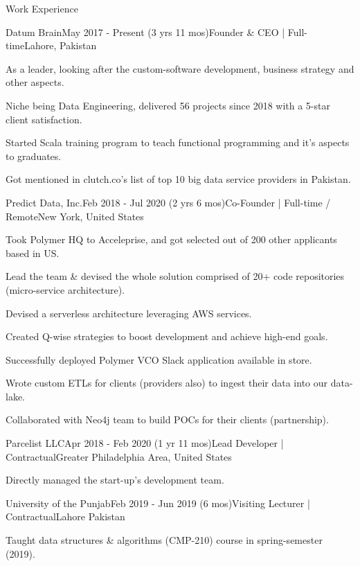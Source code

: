 \documentclass{resume}
\begin{document}
\begin{rSection}{Work Experience}
  \begin{rSubsection}{Datum Brain}{May 2017 - Present (3 yrs 11 mos)}{Founder \& CEO | Full-time}{Lahore, Pakistan}
    \item As a leader, looking after the custom-software development, business strategy and other aspects.
    \item Niche being Data Engineering, delivered 56 projects since 2018 with a 5-star client satisfaction.
    \item Started Scala training program to teach functional programming and it's aspects to graduates.
    \item Got mentioned in clutch.co's list of top 10 big data service providers in Pakistan.
  \end{rSubsection}
  \begin{rSubsection}{Predict Data, Inc.}{Feb 2018 - Jul 2020 (2 yrs 6 mos)}{Co-Founder | Full-time / Remote}{New York, United States}
    \item Took Polymer HQ to Acceleprise, and got selected out of 200 other applicants based in US.
    \item Lead the team \& devised the whole solution comprised of 20+ code repositories (micro-service architecture). 
    \item Devised a serverless architecture leveraging AWS services.
    \item Created Q-wise strategies to boost development and achieve high-end goals.
    \item Successfully deployed Polymer VCO Slack application available in store.
    \item Wrote custom ETLs for clients (providers also) to ingest their data into our data-lake.
    \item Collaborated with Neo4j team to build POCs for their clients (partnership).
  \end{rSubsection}
  \begin{rSubsection}{Parcelist LLC}{Apr 2018 - Feb 2020 (1 yr 11 mos)}{Lead Developer | Contractual}{Greater Philadelphia Area, United States}
    \item Directly managed the start-up's development team.
  \end{rSubsection}
  \begin{rSubsection}{University of the Punjab}{Feb 2019 - Jun 2019 (6 mos)}{Visiting Lecturer | Contractual}{Lahore Pakistan}
    \item Taught data structures \& algorithms (CMP-210) course in spring-semester (2019).

\end{rSubsection}
\end{rSection}
\end{document}
